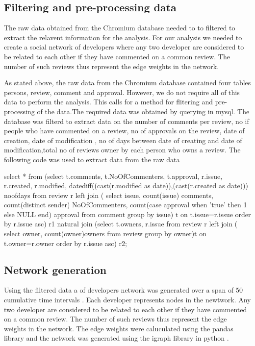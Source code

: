 \documentclass{article}
\begin{document}
\subsection{Filtering and pre-processing data}
The raw data obtained from the Chromium database needed to to filtered to extract the relavent information for the analysis. 
For our analysis we needed to create a social network of developers where any two developer are considered to be related to each other if they have commented on a common review. The number of such reviews thus represent the edge weights in the network.

As stated above, the raw data from the Chromium database contained four tables persons, review, comment and approval. However, we do not require all of this data to perform the analysis. This calls for a method for flitering and pre-processing of the data.The required data was obtained by querying in mysql. The database was filterd to extract data on the number of comments per review, no if people who have commented on a review, no of approvals on the review, date of creation, date of modification , no of days between date of creating and date of modification,total no of reviews owner by each person who owns a review. The following code was used to extract data from the raw data

select * from 
(select t.comments, t.NoOfCommenters, t.approval, r.issue, r.created, r.modified, 
datediff((cast(r.modified as date)),(cast(r.created as date))) noofdays
 from review r left join (
	select issue, count(issue) comments, count(distinct sender) NoOfCommenters, 
	count(case approval when 'true' then 1 else NULL end) approval
	from comment group by issue) t on t.issue=r.issue order by r.issue asc) r1
natural join
(select t.owners, r.issue from review r left join (
	select owner, count(owner)owners from review group by owner)t  on t.owner=r.owner order by r.issue asc) r2;

\subsection{Network generation}

Using the filtered data a of developers network was generated over a span of 50 cumulative time intervals . Each developer represents nodes in the newtwork. Any two developer are considered to be related to each other if they have commented on a common review. The number of such reviews thus represent the edge weights in the network. The edge weights were caluculated using the pandas library and the network was generated using the igraph library in python .
\end{document}

